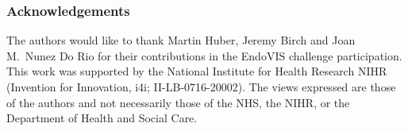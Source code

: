 \documentclass[runningheads]{llncs}
\begin{document}
\subsubsection{Acknowledgements}
The authors would like to thank Martin Huber, Jeremy Birch and Joan M.~Nunez Do Rio for their contributions in the EndoVIS challenge participation. This work was supported by the National Institute for Health Research NIHR (Invention for Innovation, i4i; II-LB-0716-20002). The views expressed are those of the authors and not necessarily those of the NHS, the NIHR, or the Department of Health and Social Care.




\end{document}
